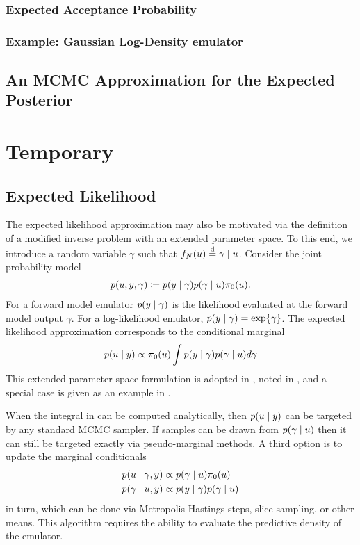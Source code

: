 \documentclass[12pt]{article}
\begin{document}
\subsubsection{Expected Acceptance Probability}
\subsubsection{Example: Gaussian Log-Density emulator}

\subsection{An MCMC Approximation for the Expected Posterior} \label{sec:mcmc-ep}


\section{Temporary}
\subsection{Expected Likelihood}
The expected likelihood approximation may also be motivated via the definition of a modified 
inverse problem with an extended parameter space. To this end, we introduce a random variable
$\gamma$ such that $\targetEm[\Ndesign](\Par) \overset{\mathrm{d}}{=} \gamma \given \Par$.
Consider the joint probability model 
\begin{align}
p(\Par, \obs, \gamma) \Def 
p(\obs \given \gamma) p(\gamma \given \Par) \priorDens(\Par). \label{eq:EL-prob-model}
\end{align}
For a forward model emulator $p(\obs \given \gamma)$ is the likelihood evaluated at
the forward model output $\gamma$. For a log-likelihood emulator, 
$p(\obs \given \gamma) = \Exp{\gamma}$. The expected likelihood approximation 
corresponds to the conditional marginal 
\begin{align}
p(\Par \given \obs) \propto \priorDens(\Par) \int p(\obs \given \gamma) p(\gamma \given \Par) d\gamma
\label{eq:EL-marginal}
\end{align}
This extended parameter space formulation is adopted in \citet{BilionisBayesSurrogates}, noted in
\citet{SinsbeckNowak}, and a special case is given as an example in \citet{StuartTeck2}.

When the integral in  can be computed analytically, then $p(\Par \given \obs)$ can 
be targeted by any standard MCMC sampler. If samples can be drawn from $p(\gamma \given \Par)$ then
it can still be targeted exactly via pseudo-marginal methods. A third option is to update the marginal conditionals
\begin{align}
p(\Par \given \gamma, \obs) &\propto p(\gamma \given \Par) \priorDens(\Par) \label{eq:EL-conditionals} \\
p(\gamma \given \Par, \obs) &\propto p(\obs \given \gamma) p(\gamma \given \Par)
\end{align}
in turn, which can be done via Metropolis-Hastings steps, slice sampling, or other means. This algorithm
requires the ability to evaluate the predictive density of the emulator.
\end{document}
